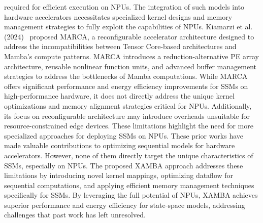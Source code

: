 required for efficient execution on NPUs. The integration of such models into hardware accelerators necessitates specialized kernel designs and memory management strategies to fully exploit the capabilities of NPUs. Kiamarzi et al. (2024)~\cite{marca} proposed MARCA, a reconfigurable accelerator architecture designed to address the incompatibilities between Tensor Core-based architectures and Mamba's compute patterns. MARCA introduces a reduction-alternative PE array architecture, reusable nonlinear function units, and advanced buffer management strategies to address the bottlenecks of Mamba computations. While MARCA offers significant performance and energy efficiency improvements for SSMs on high-performance hardware, it does not directly address the unique kernel optimizations and memory alignment strategies critical for NPUs. Additionally, its focus on reconfigurable architecture may introduce overheads unsuitable for resource-constrained edge devices. These limitations highlight the need for more specialized approaches for deploying SSMs on NPUs. These prior works have made valuable contributions to optimizing sequential models for hardware accelerators. However, none of them directly target the unique characteristics of SSMs, especially on NPUs. The proposed XAMBA approach addresses these limitations by introducing novel kernel mappings, optimizing dataflow for sequential computations, and applying efficient memory management techniques specifically for SSMs. By leveraging the full potential of NPUs, XAMBA achieves superior performance and energy efficiency for state-space models, addressing challenges that past work has left unresolved.